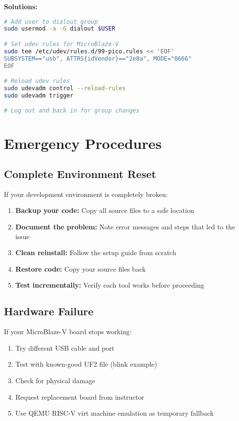 \documentclass[11pt,a4paper]{article}
\begin{document}
\textbf{Solutions:}
\begin{lstlisting}[language=bash]
# Add user to dialout group
sudo usermod -a -G dialout $USER

# Set udev rules for MicroBlaze-V
sudo tee /etc/udev/rules.d/99-pico.rules << 'EOF'
SUBSYSTEM=="usb", ATTRS{idVendor}=="2e8a", MODE="0666"
EOF

# Reload udev rules
sudo udevadm control --reload-rules
sudo udevadm trigger

# Log out and back in for group changes
\end{lstlisting}

\section{Emergency Procedures}

\subsection{Complete Environment Reset}

If your development environment is completely broken:

\begin{enumerate}
    \item \textbf{Backup your code:} Copy all source files to a safe location
    \item \textbf{Document the problem:} Note error messages and steps that led to the issue
    \item \textbf{Clean reinstall:} Follow the setup guide from scratch
    \item \textbf{Restore code:} Copy your source files back
    \item \textbf{Test incrementally:} Verify each tool works before proceeding
\end{enumerate}

\subsection{Hardware Failure}

If your MicroBlaze-V board stops working:

\begin{enumerate}
    \item Try different USB cable and port
    \item Test with known-good UF2 file (blink example)
    \item Check for physical damage
    \item Request replacement board from instructor
    \item Use QEMU RISC-V virt machine emulation as temporary fallback
\end{enumerate}
\end{document}
